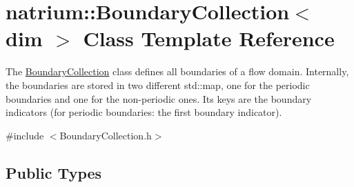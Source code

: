 \hypertarget{classnatrium_1_1BoundaryCollection}{
\section{natrium::BoundaryCollection$<$ dim $>$ Class Template Reference}
\label{classnatrium_1_1BoundaryCollection}
}


The \hyperlink{classnatrium_1_1BoundaryCollection}{BoundaryCollection} class defines all boundaries of a flow domain. Internally, the boundaries are stored in two different std::map, one for the periodic boundaries and one for the non-\/periodic ones. Its keys are the boundary indicators (for periodic boundaries: the first boundary indicator).  


{\ttfamily \#include $<$BoundaryCollection.h$>$}\subsection*{Public Types}
